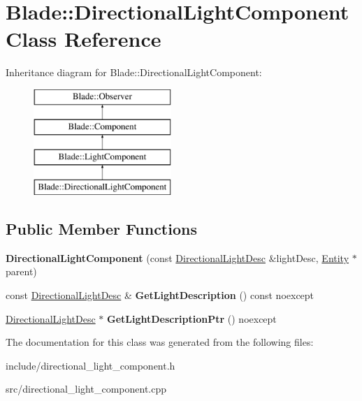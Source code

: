 \hypertarget{class_blade_1_1_directional_light_component}{}\section{Blade\+:\+:Directional\+Light\+Component Class Reference}
\label{class_blade_1_1_directional_light_component}
Inheritance diagram for Blade\+:\+:Directional\+Light\+Component\+:\begin{figure}[H]
\begin{center}
\leavevmode
\includegraphics[height=4.000000cm]{class_blade_1_1_directional_light_component}
\end{center}
\end{figure}
\subsection*{Public Member Functions}
\begin{DoxyCompactItemize}
\item 
\mbox{\label{class_blade_1_1_directional_light_component_a64adfd15c33a6672e7a61502bd73c9e6}} 
{\bfseries Directional\+Light\+Component} (const \hyperlink{struct_blade_1_1_directional_light_desc}{Directional\+Light\+Desc} \&light\+Desc, \hyperlink{class_blade_1_1_entity}{Entity} $\ast$parent)
\item 
\mbox{\label{class_blade_1_1_directional_light_component_a2d0e6f248ffd1417c96ae5bc9d61047c}} 
const \hyperlink{struct_blade_1_1_directional_light_desc}{Directional\+Light\+Desc} \& {\bfseries Get\+Light\+Description} () const noexcept
\item 
\mbox{\label{class_blade_1_1_directional_light_component_a8c2cb61aad67555b4721e2756b9e1704}} 
\hyperlink{struct_blade_1_1_directional_light_desc}{Directional\+Light\+Desc} $\ast$ {\bfseries Get\+Light\+Description\+Ptr} () noexcept
\end{DoxyCompactItemize}


The documentation for this class was generated from the following files\+:\begin{DoxyCompactItemize}
\item 
include/directional\+\_\+light\+\_\+component.\+h\item 
src/directional\+\_\+light\+\_\+component.\+cpp\end{DoxyCompactItemize}
